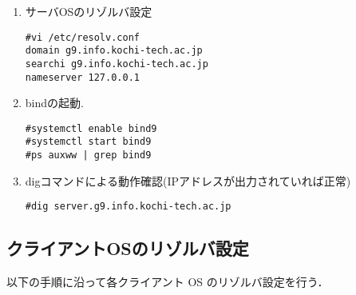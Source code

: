 \documentclass[a4j,titlepage]{jarticle}
\begin{document}
\begin{enumerate}
\item サーバOSのリゾルバ設定
  \begin{center}
    \begin{screen}
\begin{verbatim}
#vi /etc/resolv.conf
domain g9.info.kochi-tech.ac.jp
searchi g9.info.kochi-tech.ac.jp
nameserver 127.0.0.1
\end{verbatim}
    \end{screen}
  \end{center}
  \item bindの起動.
  \begin{center}
    \begin{screen}
\begin{verbatim}
#systemctl enable bind9
#systemctl start bind9
#ps auxww | grep bind9
\end{verbatim}
    \end{screen}
    \end{center}
\item digコマンドによる動作確認(IPアドレスが出力されていれば正常)
  \begin{center}
    \begin{screen}
\begin{verbatim}
#dig server.g9.info.kochi-tech.ac.jp
\end{verbatim}
    \end{screen}
  \end{center}
  \end{enumerate}

\subsection{クライアントOSのリゾルバ設定}
以下の手順に沿って各クライアント OS のリゾルバ設定を行う．
\end{document}

